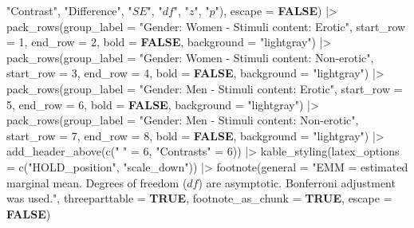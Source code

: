 \documentclass[
  bookmarksnumbered]{article}
\newenvironment{Shaded}{\begin{snugshade}}{\end{snugshade}}
\newcommand{\AttributeTok}[1]{\textcolor[rgb]{0.80,0.80,0.80}{#1}}
\newcommand{\ConstantTok}[1]{\textcolor[rgb]{0.86,0.64,0.64}{\textbf{#1}}}
\newcommand{\DecValTok}[1]{\textcolor[rgb]{0.86,0.86,0.80}{#1}}
\newcommand{\FunctionTok}[1]{\textcolor[rgb]{0.94,0.94,0.56}{#1}}
\newcommand{\NormalTok}[1]{\textcolor[rgb]{0.80,0.80,0.80}{#1}}
\newcommand{\OtherTok}[1]{\textcolor[rgb]{0.94,0.94,0.56}{#1}}
\newcommand{\SpecialCharTok}[1]{\textcolor[rgb]{0.86,0.64,0.64}{#1}}
\newcommand{\StringTok}[1]{\textcolor[rgb]{0.80,0.58,0.58}{#1}}
\begin{document}
\begin{Shaded}
\begin{Highlighting}[]
                        \StringTok{"Contrast"}\NormalTok{,}
                        \StringTok{"Difference"}\NormalTok{,}
                        \StringTok{"$SE$"}\NormalTok{,}
                        \StringTok{"$df$"}\NormalTok{,}
                        \StringTok{"$z$"}\NormalTok{,}
                        \StringTok{"$p$"}\NormalTok{),}
          \AttributeTok{escape =} \ConstantTok{FALSE}\NormalTok{) }\SpecialCharTok{|\textgreater{}}
  \FunctionTok{pack\_rows}\NormalTok{(}\AttributeTok{group\_label =} \StringTok{"Gender: Women {-} Stimuli content: Erotic"}\NormalTok{,}
            \AttributeTok{start\_row =} \DecValTok{1}\NormalTok{,}
            \AttributeTok{end\_row =} \DecValTok{2}\NormalTok{,}
            \AttributeTok{bold =} \ConstantTok{FALSE}\NormalTok{,}
            \AttributeTok{background =} \StringTok{"lightgray"}\NormalTok{) }\SpecialCharTok{|\textgreater{}}
  \FunctionTok{pack\_rows}\NormalTok{(}\AttributeTok{group\_label =} \StringTok{"Gender: Women {-} Stimuli content: Non{-}erotic"}\NormalTok{,}
            \AttributeTok{start\_row =} \DecValTok{3}\NormalTok{,}
            \AttributeTok{end\_row =} \DecValTok{4}\NormalTok{,}
            \AttributeTok{bold =} \ConstantTok{FALSE}\NormalTok{,}
            \AttributeTok{background =} \StringTok{"lightgray"}\NormalTok{) }\SpecialCharTok{|\textgreater{}}
  \FunctionTok{pack\_rows}\NormalTok{(}\AttributeTok{group\_label =} \StringTok{"Gender: Men {-} Stimuli content: Erotic"}\NormalTok{,}
            \AttributeTok{start\_row =} \DecValTok{5}\NormalTok{,}
            \AttributeTok{end\_row =} \DecValTok{6}\NormalTok{,}
            \AttributeTok{bold =} \ConstantTok{FALSE}\NormalTok{,}
            \AttributeTok{background =} \StringTok{"lightgray"}\NormalTok{) }\SpecialCharTok{|\textgreater{}}
  \FunctionTok{pack\_rows}\NormalTok{(}\AttributeTok{group\_label =} \StringTok{"Gender: Men {-} Stimuli content: Non{-}erotic"}\NormalTok{,}
            \AttributeTok{start\_row =} \DecValTok{7}\NormalTok{,}
            \AttributeTok{end\_row =} \DecValTok{8}\NormalTok{,}
            \AttributeTok{bold =} \ConstantTok{FALSE}\NormalTok{,}
            \AttributeTok{background =} \StringTok{"lightgray"}\NormalTok{) }\SpecialCharTok{|\textgreater{}}
  \FunctionTok{add\_header\_above}\NormalTok{(}\FunctionTok{c}\NormalTok{(}\StringTok{" "} \OtherTok{=} \DecValTok{6}\NormalTok{, }\StringTok{"Contrasts"} \OtherTok{=} \DecValTok{6}\NormalTok{)) }\SpecialCharTok{|\textgreater{}} 
  \FunctionTok{kable\_styling}\NormalTok{(}\AttributeTok{latex\_options =} \FunctionTok{c}\NormalTok{(}\StringTok{"HOLD\_position"}\NormalTok{, }\StringTok{"scale\_down"}\NormalTok{)) }\SpecialCharTok{|\textgreater{}}
  \FunctionTok{footnote}\NormalTok{(}\AttributeTok{general =} \StringTok{"EMM = estimated marginal mean.}
\StringTok{           Degrees of freedom ($df$) are asymptotic.}
\StringTok{           Bonferroni adjustment was used."}\NormalTok{,}
           \AttributeTok{threeparttable =} \ConstantTok{TRUE}\NormalTok{,}
           \AttributeTok{footnote\_as\_chunk =} \ConstantTok{TRUE}\NormalTok{,}
           \AttributeTok{escape =} \ConstantTok{FALSE}\NormalTok{)}
\end{Highlighting}
\end{Shaded}
\end{document}
